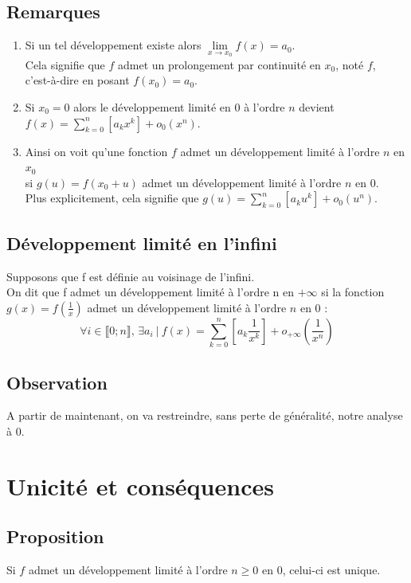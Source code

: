 \documentclass[a4paper,10pt]{book} %
\newcommand{\dl}{développement limité }
\newcommand{\tq}{~|~}
\begin{document}
\subsection{Remarques}
\begin{enumerate}
\item Si un tel développement existe alors $\lim\limits_{x\rightarrow x_0}f(x)=a_0$.\\
Cela signifie que $f$ admet un prolongement par continuité en $x_0$, noté $f$,\\
c'est-à-dire en posant $f(x_0)=a_0$.

\item Si $x_0=0$ alors le développement limité en $0$ à l'ordre $n$ devient $\displaystyle f(x)=\sum\limits_{k=0}^{n}\left[a_kx^k\right]+o_0(x^n)$.

\item Ainsi on voit qu'une fonction $f$ admet un développement limité à l'ordre $n$ en $x_0$\\ si $g(u)=f(x_0+u)$ admet un développement limité à l'ordre $n$ en 0.\\
Plus explicitement, cela signifie que $\displaystyle g(u)=\sum\limits_{k=0}^{n}[a_ku^k]+o_0(u^n)$.
\end{enumerate}

\subsection{Développement limité en l'infini}
Supposons que f est définie au voisinage de l'infini.\\

On dit que f admet un développement limité à l'ordre n en $+\infty$ si la fonction $g(x)=f(\frac{1}{x})$ admet un \dl à l'ordre $n$ en 0 : $$\forall i\in \llbracket0;n\rrbracket\text{, }\exists a_i \tq f(x)=\sum\limits_{k=0}^{n}[a_k\frac{1}{x^k}]+o_{+\infty}(\frac{1}{x^n})$$

\subsection{Observation}
A partir de maintenant, on va restreindre, sans perte de généralité, notre analyse à 0.

\section{Unicité et conséquences}
\subsection{Proposition}
Si $f$ admet un \dl à l'ordre $n\geq 0$ en 0, celui-ci est unique.
\end{document}
